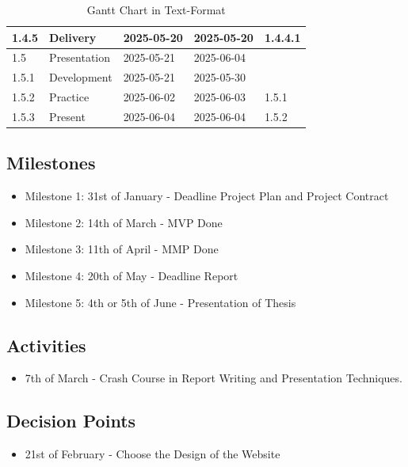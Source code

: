 \begin{table}[H]
\begin{tabular}{|l|l|l|l|l|}
        1.4.5 & Delivery & 2025-05-20 & 2025-05-20 & 1.4.4.1 \\ \hline
        1.5 & Presentation & 2025-05-21 & 2025-06-04 & ~ \\ \hline
        1.5.1 & Development & 2025-05-21 & 2025-05-30 & ~ \\ \hline
        1.5.2 & Practice & 2025-06-02 & 2025-06-03 & 1.5.1 \\ \hline
        1.5.3 & Present & 2025-06-04 & 2025-06-04 & 1.5.2 \\ \hline
    \end{tabular}
    \caption{Gantt Chart in Text-Format}
    \label{tab:gantt_text}
\end{table}

\subsection{Milestones}
\begin{itemize}
    \item Milestone 1: 31st of January - Deadline Project Plan and Project Contract
    \item Milestone 2: 14th of March - MVP Done
    \item Milestone 3: 11th of April - MMP Done
    \item Milestone 4: 20th of May - Deadline Report
    \item Milestone 5: 4th or 5th of June - Presentation of Thesis
\end{itemize}

\subsection{Activities}
\begin{itemize}
    \item 7th of March - Crash Course in Report Writing and Presentation Techniques.
\end{itemize}

\subsection{Decision Points}
\begin{itemize}
    \item 21st of February - Choose the Design of the Website
\end{itemize}

\newpage
